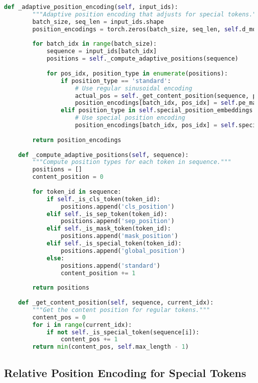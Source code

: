 \begin{lstlisting}[language=Python, caption=Flexible position encoding for special tokens]
    def _adaptive_position_encoding(self, input_ids):
        """Adaptive position encoding that adjusts for special tokens."""
        batch_size, seq_len = input_ids.shape
        position_encodings = torch.zeros(batch_size, seq_len, self.d_model)
        
        for batch_idx in range(batch_size):
            sequence = input_ids[batch_idx]
            positions = self._compute_adaptive_positions(sequence)
            
            for pos_idx, position_type in enumerate(positions):
                if position_type == 'standard':
                    # Use regular sinusoidal encoding
                    actual_pos = self._get_content_position(sequence, pos_idx)
                    position_encodings[batch_idx, pos_idx] = self.pe_matrix[actual_pos]
                elif position_type in self.special_position_embeddings:
                    # Use special position encoding
                    position_encodings[batch_idx, pos_idx] = self.special_position_embeddings[position_type]
                    
        return position_encodings
        
    def _compute_adaptive_positions(self, sequence):
        """Compute position types for each token in sequence."""
        positions = []
        content_position = 0
        
        for token_id in sequence:
            if self._is_cls_token(token_id):
                positions.append('cls_position')
            elif self._is_sep_token(token_id):
                positions.append('sep_position')
            elif self._is_mask_token(token_id):
                positions.append('mask_position')
            elif self._is_special_token(token_id):
                positions.append('global_position')
            else:
                positions.append('standard')
                content_position += 1
                
        return positions
        
    def _get_content_position(self, sequence, current_idx):
        """Get the content position for regular tokens."""
        content_pos = 0
        for i in range(current_idx):
            if not self._is_special_token(sequence[i]):
                content_pos += 1
        return min(content_pos, self.max_length - 1)
\end{lstlisting}

\subsection{Relative Position Encoding for Special Tokens}

